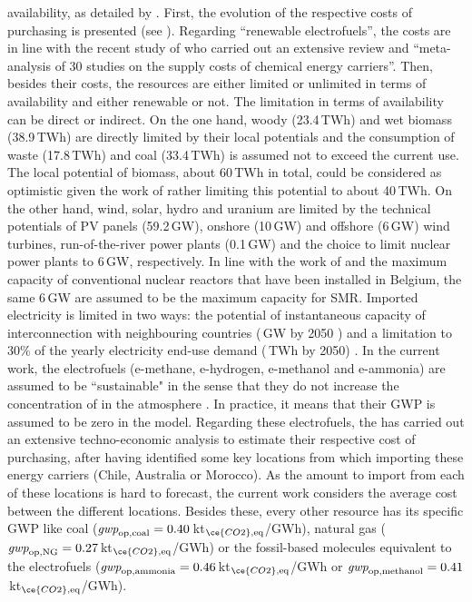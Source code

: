 availability, as detailed by \citet{limpens2024pathway}. First, the evolution of the respective costs of purchasing is presented (see ). Regarding ``renewable electrofuels'', the costs are in line with the recent study of \citet{genge2023supply} who carried out an extensive review and ``meta-analysis \cite{grant2009typology,page2021prisma} of 30 studies on the supply costs of chemical energy carriers''. Then, besides their costs, the resources are either limited or unlimited in terms of availability and either renewable or not. The limitation in terms of availability can be direct or indirect. On the one hand, woody (23.4\,TWh) and wet biomass (38.9\,TWh) are directly limited by their local potentials and the consumption of waste (17.8\,TWh) and coal (33.4\,TWh) is assumed not to exceed the current use. The local potential of biomass, \ie about 60\,TWh in total, could be considered as optimistic given the work of \citet{colla2024navigating} rather limiting this potential to about 40\,TWh. On the other hand, wind, solar, hydro and uranium are limited by the technical potentials of \gls{PV} panels (59.2\,GW), onshore (10\,GW) and offshore (6\,GW) wind turbines, run-of-the-river power plants (0.1\,GW) and the choice to limit nuclear power plants to 6\,GW, respectively. In line with the work of \citet{PATHS2050} and the maximum capacity of conventional nuclear reactors that have been installed in Belgium, the same 6\,GW are assumed to be the maximum capacity for \gls{SMR}. Imported electricity is limited in two ways: the potential of instantaneous capacity of interconnection with neighbouring countries (\,GW by 2050 \cite{ELIA_2050}) and a limitation to 30\% of the yearly electricity end-use demand (\,TWh by 2050) \cite{limpens2021generating}. In the current work, the electrofuels (\ie e-methane, e-hydrogen, e-methanol and e-ammonia) are assumed to be ``sustainable" in the sense that they do not increase the concentration of  in the atmosphere \cite{rixhon2021terminology}. In practice, it means that their \gls{GWP} is assumed to be zero in the model. Regarding these electrofuels, the \citet{h2coalition} has carried out an extensive techno-economic analysis to estimate their respective cost of purchasing, after having identified some key locations from which importing these energy carriers (\eg Chile, Australia or Morocco). As the amount to import from each of these locations is hard to forecast, the current work considers the average cost between the different locations. Besides these, every other resource has its specific \gls{GWP} like coal ($\emph{gwp}_{\mathrm{op,coal}}=0.40$\,kt$_{\ce{CO2},\text{eq}}$/GWh), natural gas ($\emph{gwp}_{\mathrm{op,NG}}=0.27$\,kt$_{\ce{CO2},\text{eq}}$/GWh) or the fossil-based molecules equivalent to the electrofuels (\eg $\emph{gwp}_{\mathrm{op,ammonia}}=0.46$\,kt$_{\ce{CO2},\text{eq}}$/GWh or $\emph{gwp}_{\mathrm{op,methanol}}=0.41$\,kt$_{\ce{CO2},\text{eq}}$/GWh).


